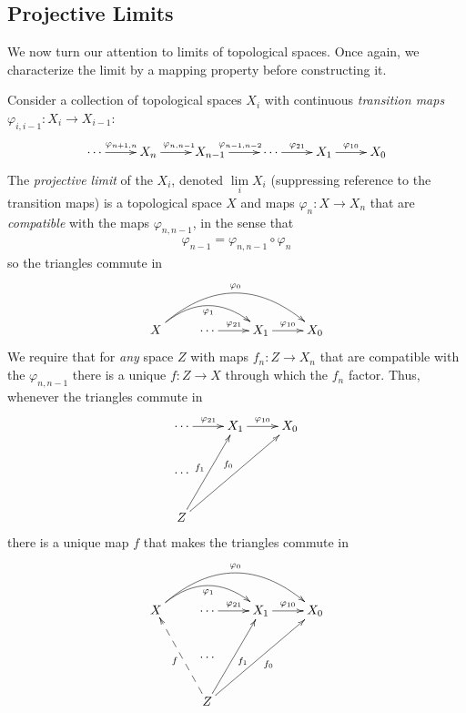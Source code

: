       \subsection{Projective Limits}
        We now turn our attention to limits of topological spaces.
        Once again, we characterize the limit by a mapping property before constructing it.
        \begin{defn}
          \label{defn:projlim}
          Consider a collection of topological spaces $X_i$ with continuous \emph{transition maps} $\varphi_{i,i-1}:X_i\rightarrow X_{i-1}$:
          \begin{displaymath}
            \xymatrix{
              \cdots \ar[r]^{\varphi_{n+1,n}} & X_n \ar[r]^{\varphi_{n,n-1}} & X_{n-1} \ar[r]^{\varphi_{n-1,n-2}} & \cdots \ar[r]^{\varphi_{21}} & X_1 \ar[r]^{\varphi_{10}} & X_0
            }
          \end{displaymath}
          The \emph{projective limit} of the $X_i$, denoted $\lim\limits_i X_i$ (suppressing reference to the transition maps) is a topological space $X$ and maps $\varphi_n:X\rightarrow X_n$ that are \emph{compatible} with the maps $\varphi_{n,n-1}$, in the sense that 
          \begin{align*}
            \varphi_{n-1}=\varphi_{n,n-1}\circ\varphi_n
          \end{align*}
          so the triangles commute in
          \begin{displaymath}
            \xymatrix{
              X \ar@/^20pt/[rr]_{\varphi_1} \ar@/^30pt/[rrr]^{\varphi_0}
              & \cdots \ar[r]^{\varphi_{21}}
              & X_1 \ar[r]^{\varphi_{10}}
              & X_0
            }
          \end{displaymath}
          We require that for \emph{any} space $Z$ with maps $f_n:Z\rightarrow X_n$ that are compatible with the $\varphi_{n,n-1}$ there is a unique $f:Z\rightarrow X$ through which the $f_n$ factor.
          Thus, whenever the triangles commute in
          \begin{displaymath}
            \xymatrix{
               \cdots \ar[r]^{\varphi_{21}}
              & X_1 \ar[r]^{\varphi_{10}}
              & X_0
              \\ \cdots \\
              Z \ar[uur]^{f_1} \ar[uurr]^{f_0}
            }
          \end{displaymath}
          there is a unique map $f$ that makes the triangles commute in
          \begin{displaymath}
            \xymatrix{
              X \ar@/^20pt/[rr]_{\varphi_1} \ar@/^30pt/[rrr]^{\varphi_0}
              & \cdots \ar[r]^{\varphi_{21}}
              & X_1 \ar[r]^{\varphi_{10}}
              & X_0
              \\ & \cdots \\
              & Z \ar@{-->}[uul]^f \ar[uur]_{f_1} \ar[uurr]_{f_0}
            }
          \end{displaymath}
        \end{defn}
